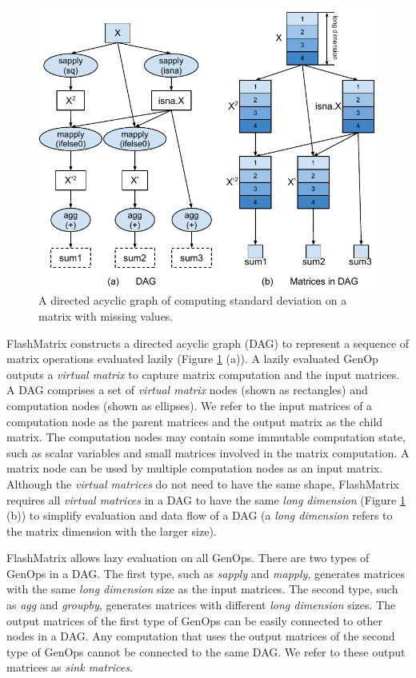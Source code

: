 \begin{figure}
	\centering
	\includegraphics[scale=0.7]{./sd.pdf}
	\caption{A directed acyclic graph of computing standard deviation on
	a matrix with missing values.}
	\label{fig:DAG}
\end{figure}

FlashMatrix constructs a directed acyclic graph (DAG) to represent a sequence
of matrix operations evaluated lazily (Figure \ref{fig:DAG} (a)). A lazily
evaluated GenOp outputs a \textit{virtual matrix} to capture matrix computation
and the input matrices. A
DAG comprises a set of \textit{virtual matrix} nodes (shown as rectangles)
and computation nodes (shown as ellipses). We refer to the input matrices of
a computation node as the parent matrices and the output matrix as the child matrix.
The computation nodes may contain some immutable computation state, such as
scalar variables and small matrices involved in the matrix computation.
A matrix node can be used by multiple computation nodes as
an input matrix. Although the \textit{virtual matrices} do not need to have
the same shape, FlashMatrix requires all \textit{virtual matrices} in a DAG
to have the same \textit{long dimension} (Figure \ref{fig:DAG} (b)) to
simplify evaluation and data flow of a DAG (a \textit{long dimension}
refers to the matrix dimension with the larger size).

FlashMatrix allows lazy evaluation on all GenOps. There are two types of GenOps
in a DAG. The first type, such as \textit{sapply} and \textit{mapply}, generates
matrices with the same \textit{long dimension} size as the input matrices.
The second type, such as \textit{agg} and \textit{groupby}, generates matrices
with different \textit{long dimension} sizes. The output matrices of the first
type of GenOps can be easily connected to other nodes in a DAG. Any computation
that %
uses the output matrices of the second type of GenOps
cannot be connected to the same DAG.  We refer to these output matrices as
\textit{sink matrices}.

